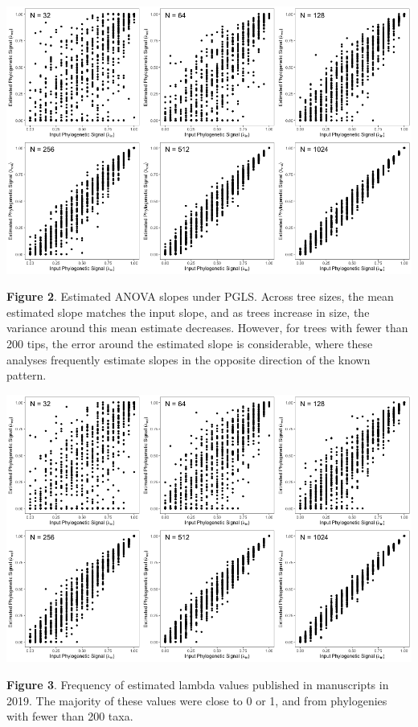\documentclass[
]{article}
\begin{document}
\includegraphics[width=0.95\linewidth]{Fig2}

\singlespacing \textbf{Figure 2}. Estimated ANOVA slopes under PGLS.
Across tree sizes, the mean estimated slope matches the input slope, and
as trees increase in size, the variance around this mean estimate
decreases. However, for trees with fewer than 200 tips, the error around
the estimated slope is considerable, where these analyses frequently
estimate slopes in the opposite direction of the known pattern.
\hfill\break

\newpage

\includegraphics[width=0.95\linewidth]{Fig3}

\singlespacing \textbf{Figure 3}. Frequency of estimated lambda values
published in manuscripts in 2019. The majority of these values were
close to 0 or 1, and from phylogenies with fewer than 200 taxa.
\end{document}
